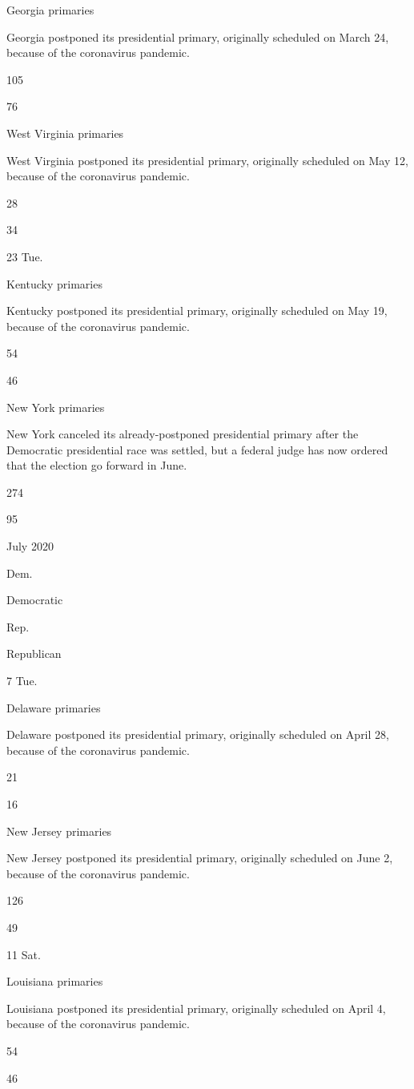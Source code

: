 Georgia primaries

Georgia postponed its presidential primary, originally scheduled on
March 24, because of the coronavirus pandemic.

105

76

West Virginia primaries

West Virginia postponed its presidential primary, originally scheduled
on May 12, because of the coronavirus pandemic.

28

34

23 Tue.

Kentucky primaries

Kentucky postponed its presidential primary, originally scheduled on May
19, because of the coronavirus pandemic.

54

46

New York primaries

New York canceled its already-postponed presidential primary after the
Democratic presidential race was settled, but a federal judge has now
ordered that the election go forward in June.

274

95

July 2020

Dem.

Democratic

Rep.

Republican

7 Tue.

Delaware primaries

Delaware postponed its presidential primary, originally scheduled on
April 28, because of the coronavirus pandemic.

21

16

New Jersey primaries

New Jersey postponed its presidential primary, originally scheduled on
June 2, because of the coronavirus pandemic.

126

49

11 Sat.

Louisiana primaries

Louisiana postponed its presidential primary, originally scheduled on
April 4, because of the coronavirus pandemic.

54

46

